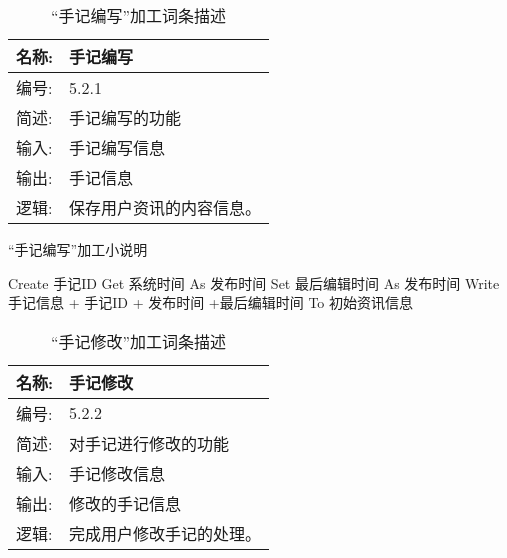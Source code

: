 \begin{table}[H]  
\caption{“手记编写”加工词条描述}  
\begin{center}  
    \begin{tabular}{l p{11cm}} 
        \hline
        \quad 名称:  &  手记编写 \\
        \hline
        \quad 编号:  & 5.2.1 \\
        \hline
        \quad 简述:  & 手记编写的功能 \\
        \hline
        \quad 输入:  & 手记编写信息 \\
        \hline
        \quad 输出:  & 手记信息 \\
        \hline
        \quad 逻辑:  & 保存用户资讯的内容信息。 \\
        \hline
    \end{tabular}
    \label{tab1}
\end{center}
\end{table}

\begin{algorithm}[H]
    \renewcommand{\thealgorithm}{}
    \caption{“手记编写”加工小说明} 
    \label{alg3} 
    \begin{algorithmic}[1]
        \STATE Create 手记ID
        \STATE Get 系统时间 As 发布时间
        \STATE Set 最后编辑时间 As 发布时间
        \STATE Write 手记信息 + 手记ID + 发布时间 +最后编辑时间 To 初始资讯信息
    \end{algorithmic} 
\end{algorithm}

\begin{table}[H]  
\caption{“手记修改”加工词条描述}  
\begin{center}  
    \begin{tabular}{l p{11cm}} 
        \hline
        \quad 名称:  &  手记修改 \\
        \hline
        \quad 编号:  & 5.2.2 \\
        \hline
        \quad 简述:  & 对手记进行修改的功能 \\
        \hline
        \quad 输入:  & 手记修改信息 \\
        \hline
        \quad 输出:  & 修改的手记信息 \\
        \hline
        \quad 逻辑:  & 完成用户修改手记的处理。 \\
        \hline
    \end{tabular}
    \label{tab1}
\end{center}
\end{table}

